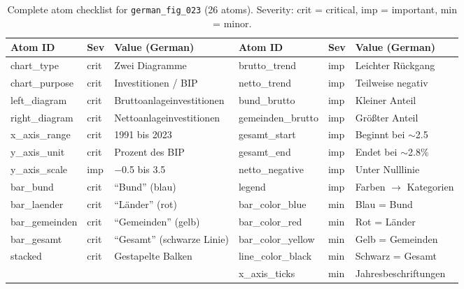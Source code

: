 \vspace{8pt}
\begin{table}[H]
\centering
\scriptsize
\caption{Complete atom checklist for \texttt{german\_fig\_023} (26 atoms). Severity: crit = critical, imp = important, min = minor.}\label{tab:atoms-full}
\setlength{\tabcolsep}{2pt}
\begin{tabular}{@{}llp{4.5cm}@{\qquad}llp{4.5cm}@{}}
\toprule
\textbf{Atom ID} & \textbf{Sev} & \textbf{Value (German)} & \textbf{Atom ID} & \textbf{Sev} & \textbf{Value (German)} \\
\midrule
chart\_type & crit & Zwei Diagramme & brutto\_trend & imp & Leichter R\"uckgang \\
chart\_purpose & crit & Investitionen / BIP & netto\_trend & imp & Teilweise negativ \\
left\_diagram & crit & Bruttoanlageinvestitionen & bund\_brutto & imp & Kleiner Anteil \\
right\_diagram & crit & Nettoanlageinvestitionen & gemeinden\_brutto & imp & Gr\"o\ss ter Anteil \\
x\_axis\_range & crit & 1991 bis 2023 & gesamt\_start & imp & Beginnt bei ${\sim}$2.5 \\
y\_axis\_unit & crit & Prozent des BIP & gesamt\_end & imp & Endet bei ${\sim}$2.8\% \\
y\_axis\_scale & imp & $-$0.5 bis 3.5 & netto\_negative & imp & Unter Nulllinie \\
bar\_bund & crit & ``Bund'' (blau) & legend & imp & Farben $\to$ Kategorien \\
bar\_laender & crit & ``L\"ander'' (rot) & bar\_color\_blue & min & Blau = Bund \\
bar\_gemeinden & crit & ``Gemeinden'' (gelb) & bar\_color\_red & min & Rot = L\"ander \\
bar\_gesamt & crit & ``Gesamt'' (schwarze Linie) & bar\_color\_yellow & min & Gelb = Gemeinden \\
stacked & crit & Gestapelte Balken & line\_color\_black & min & Schwarz = Gesamt \\
 & & & x\_axis\_ticks & min & Jahresbeschriftungen \\
\bottomrule
\end{tabular}
\end{table}

